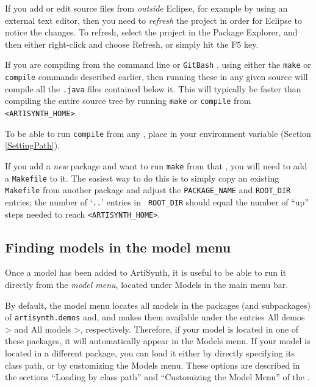 \begin{sideblock}
If you add or edit source files from {\it outside} Eclipse, for
example by using an external text editor, then you need to {\it
refresh} the project in order for Eclipse to notice the changes.  To
refresh, select the project in the Package Explorer, and then either
right-click and choose {\sf Refresh}, or simply hit the {\sf F5} key.
\end{sideblock}

If you are compiling from the command line 
\ifWindows
or {\tt GitBash}%
\fi
, using either the {\tt make} or {\tt compile} commands described
earlier, then running these in any given source \directory{}
will compile all the {\tt .java} files contained below it. This will
typically be faster than compiling the entire source tree by running
{\tt make} or {\tt compile} from {\tt <ARTISYNTH\_HOME>}.

\begin{sideblock}
To be able to run {\tt compile} from any \directory{},
place  in your \PATH{} environment variable
(Section \ref{SettingPath}).
\end{sideblock}

\begin{sideblock}
If you add a {\it new} package \directory{} and want to run {\tt make}
from that \directory{}, you will need to add a {\tt Makefile} to
it. The easiest way to do this is to simply copy an existing {\tt
Makefile} from another package and adjust the {\tt PACKAGE\_NAME} and
{\tt ROOT\_DIR} entries; the number of `{\tt ..}'  entries in {\tt
ROOT\_DIR} should equal the number of ``up'' steps needed to reach
{\tt <ARTISYNTH\_HOME>}.
\end{sideblock}

\subsection{Finding models in the model menu}

Once a model has been added to ArtiSynth, it is useful to be able to
run it directly from the {\it model menu}, located under {\sf Models}
in the main menu bar.

By default, the model menu locates all models in the packages
(and subpackages) of {\tt artisynth.demos} and, and makes them available under the entries {\sf All
demos >} and {\sf All models >}, respectively. Therefore, if your
model is located in one of these packages, it will automatically
appear in the {\sf Models} menu. If your model is located in a
different package, you can load it either by directly specifying its
class path, or by customizing the {\sf Models} menu.  These options
are described in the sections ``Loading by class path'' and
``Customizing the Model Menu'' of the
.

